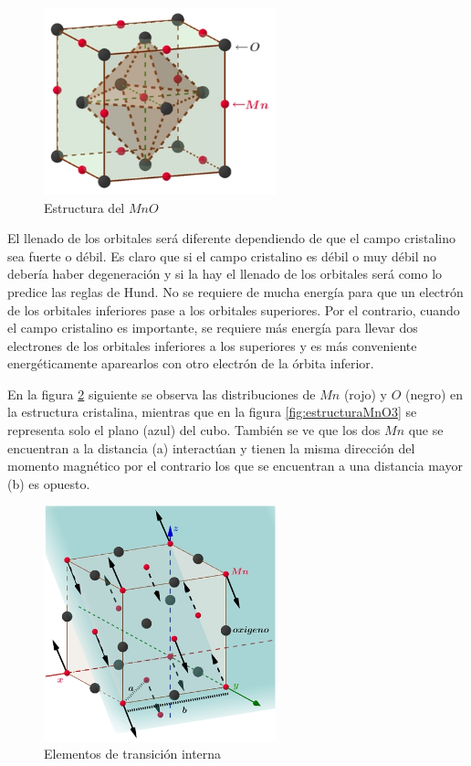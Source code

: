 \begin{figure}[H]
    \centering
    \includegraphics[width=0.6\textwidth]{./Figures/estructuraMnO}
	\caption{Estructura del $MnO$}
	\label{fig:estructuraMnO}
\end{figure}

El llenado de los orbitales será diferente dependiendo de que el campo cristalino sea fuerte o débil. Es claro que si el campo cristalino es débil o muy débil no debería haber degeneración y si la hay el llenado de los orbitales será como lo predice las reglas de Hund. No se requiere de mucha energía para que un electrón de los orbitales inferiores pase a los orbitales superiores. Por el contrario, cuando el campo cristalino es importante, se requiere más energía para llevar dos electrones de los orbitales inferiores a los superiores y es más conveniente energéticamente aparearlos con otro electrón de la órbita inferior.

En la figura \ref{fig:estructuraMnO2} siguiente se observa las distribuciones de $Mn$ (rojo) y $O$ (negro) en la estructura cristalina, mientras que en la figura \ref{fig:estructuraMnO3} se representa solo el plano (azul) del cubo. También se ve que los dos $Mn$ que se encuentran a la distancia (a) interactúan y tienen la misma dirección del momento magnético por el contrario los que se encuentran a una distancia mayor (b) es opuesto.


\begin{figure}[H]
    \centering
    \includegraphics[width=0.6\textwidth]{./Figures/estructuraMnO2}
	\caption{Elementos de transición interna}
	\label{fig:estructuraMnO2}
\end{figure}


